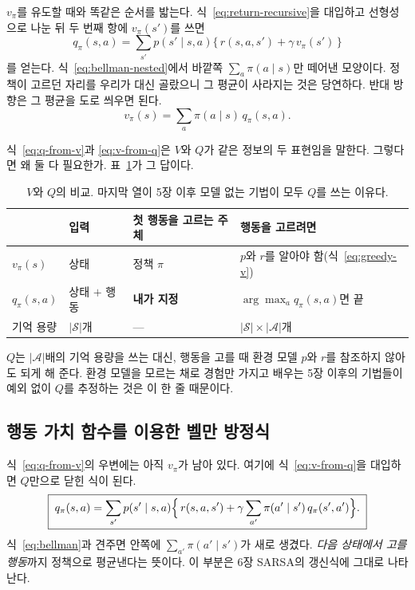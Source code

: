 \documentclass[11pt,a4paper]{article}
\newcommand{\Sset}{\mathcal{S}}
\newcommand{\Aset}{\mathcal{A}}
\begin{document}
$v_\pi$를 유도할 때와 똑같은 순서를 밟는다. 식~\eqref{eq:return-recursive}을 대입하고 선형성으로 나눈 뒤
두 번째 항에 $v_\pi(s')$를 쓰면
\begin{equation}
  \boxed{\;
  q_\pi(s,a) = \sum_{s'} p(s'\mid s,a)\bigl\{\, r(s,a,s') + \gamma\, v_\pi(s') \,\bigr\}
  \;}
  \label{eq:q-from-v}
\end{equation}
를 얻는다. 식~\eqref{eq:bellman-nested}에서 바깥쪽 $\sum_a \pi(a\mid s)$만 떼어낸 모양이다. 정책이
고르던 자리를 우리가 대신 골랐으니 그 평균이 사라지는 것은 당연하다. 반대 방향은 그 평균을 도로
씌우면 된다.
\begin{equation}
  \boxed{\;
  v_\pi(s) = \sum_{a} \pi(a\mid s)\, q_\pi(s,a).
  \;}
  \label{eq:v-from-q}
\end{equation}

식~\eqref{eq:q-from-v}과 \eqref{eq:v-from-q}은 $V$와 $Q$가 같은 정보의 두 표현임을 말한다. 그렇다면 왜
둘 다 필요한가. 표~\ref{tab:v-vs-q}가 그 답이다.

\begin{table}[htbp]
\centering
\caption{$V$와 $Q$의 비교. 마지막 열이 5장 이후 모델 없는 기법이 모두 $Q$를 쓰는 이유다.}
\label{tab:v-vs-q}
\small
\begin{tabular}{@{}llll@{}}
\toprule
 & 입력 & 첫 행동을 고르는 주체 & 행동을 고르려면 \\
\midrule
$v_\pi(s)$    & 상태             & 정책 $\pi$   & $p$와 $r$를 알아야 함(식~\eqref{eq:greedy-v}) \\
$q_\pi(s,a)$  & 상태 $+$ 행동    & \textbf{내가 지정} & $\arg\max_a q_\pi(s,a)$면 끝 \\
\midrule
기억 용량     & $|\Sset|$개      & --- & $|\Sset|\times|\Aset|$개 \\
\bottomrule
\end{tabular}
\end{table}

$Q$는 $|\Aset|$배의 기억 용량을 쓰는 대신, 행동을 고를 때 환경 모델 $p$와 $r$를 참조하지 않아도 되게
해 준다. 환경 모델을 모르는 채로 경험만 가지고 배우는 5장 이후의 기법들이 예외 없이 $Q$를 추정하는
것은 이 한 줄 때문이다.

\subsection{행동 가치 함수를 이용한 벨만 방정식}
\label{sec:q-bellman-sec}

식~\eqref{eq:q-from-v}의 우변에는 아직 $v_\pi$가 남아 있다. 여기에 식~\eqref{eq:v-from-q}을 대입하면
$Q$만으로 닫힌 식이 된다.
\begin{equation}
  \boxed{\;
  q_\pi(s,a) = \sum_{s'} p(s'\mid s,a)\Bigl\{\, r(s,a,s')
               + \gamma \sum_{a'} \pi(a'\mid s')\, q_\pi(s',a') \Bigr\}.
  \;}
  \label{eq:q-bellman}
\end{equation}
식~\eqref{eq:bellman}과 견주면 안쪽에 $\sum_{a'}\pi(a'\mid s')$가 새로 생겼다. \emph{다음 상태에서 고를
행동}까지 정책으로 평균낸다는 뜻이다. 이 부분은 6장 SARSA의 갱신식에 그대로 나타난다.
\end{document}
